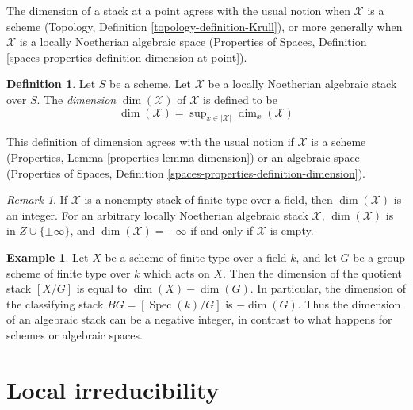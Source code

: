 \documentclass{stacks-project}
\theoremstyle{plain}
\theoremstyle{definition}
\newtheorem{definition}[subsection]{Definition}
\newtheorem{example}[subsection]{Example}
\theoremstyle{remark}
\newtheorem{remark}[subsection]{Remark}
\numberwithin{equation}{subsection}
\def\Spec{\mathop{\mathrm{Spec}}}
\begin{document}
\noindent
The dimension of a stack at a point agrees with the usual notion
when $\mathcal{X}$ is a scheme (Topology, Definition
\ref{topology-definition-Krull}),
or more generally when $\mathcal{X}$ is a locally Noetherian algebraic space
(Properties of Spaces, Definition
\ref{spaces-properties-definition-dimension-at-point}).

\begin{definition}
\label{definition-dimension}
Let $S$ be a scheme. Let $\mathcal{X}$ be
a locally Noetherian algebraic stack over $S$.
The {\it dimension} $\dim(\mathcal{X})$ of $\mathcal{X}$ is defined to be
$$
\dim(\mathcal{X}) = \sup\nolimits_{x \in |\mathcal{X}|} \dim_x(\mathcal{X})
$$
\end{definition}

\noindent
This definition of dimension agrees with the usual notion
if $\mathcal{X}$ is a scheme
(Properties, Lemma \ref{properties-lemma-dimension})
or an algebraic space (Properties of Spaces, Definition
\ref{spaces-properties-definition-dimension}).

\begin{remark}
\label{remark-dimension-empty-stack}
If $\mathcal{X}$ is a nonempty stack of finite type over a field,
then $\dim(\mathcal{X})$ is an integer. For an arbitrary
locally Noetherian algebraic stack $\mathcal{X}$,
$\dim(\mathcal{X})$ is in $Z\cup \{\pm \infty\}$,
and $\dim(\mathcal{X}) = -\infty$ if and only if $\mathcal{X}$
is empty.
\end{remark}

\begin{example}
\label{example-dimension-quotient-stack}
Let $X$ be a scheme of finite type over a field $k$, and let $G$
be a group scheme of finite type over $k$ which acts on $X$.
Then the dimension of the quotient stack $[X/G]$ is equal to
$\dim(X)-\dim(G)$. In particular, the dimension of the classifying
stack $BG=[\Spec(k)/G]$ is $-\dim(G)$. Thus the dimension of an algebraic
stack can be a negative integer, in contrast to what happens for schemes
or algebraic spaces.
\end{example}






\section{Local irreducibility}
\label{section-irreducible-local-ring}
\end{document}
